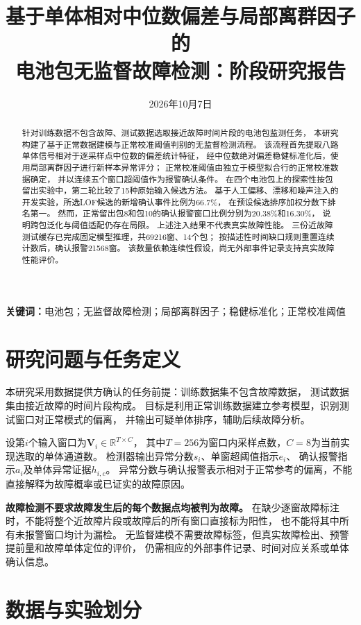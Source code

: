 \documentclass[UTF8,a4paper,12pt,fontset=fandol]{ctexart}
\title{基于单体相对中位数偏差与局部离群因子的\\电池包无监督故障检测：阶段研究报告}
\author{}
\date{2026年10月7日}
\begin{document}
\maketitle
\thispagestyle{plain}

\begin{abstract}
针对训练数据不包含故障、测试数据选取接近故障时间片段的电池包监测任务，
本研究构建了基于正常数据建模与正常校准阈值判别的无监督检测流程。
该流程首先提取八路单体信号相对于逐采样点中位数的偏差统计特征，
经中位数绝对偏差稳健标准化后，使用局部离群因子进行新样本异常评分；
正常校准阈值由独立于模型拟合行的正常校准数据确定，
并以连续五个窗口超阈值作为报警确认条件。
在四个电池包上的探索性按包留出实验中，第二轮比较了15种原始输入候选方法。
基于人工偏移、漂移和噪声注入的开发实验，所选LOF候选的新增确认事件比例为66.7\%，
在预设候选排序加权分数下排名第一。
然而，正常留出包8和包10的确认报警窗口比例分别为20.38\%和16.30\%，
说明跨包泛化与阈值适配仍存在局限。
上述注入结果不代表真实故障性能。
三份近故障测试缓存已完成固定模型推理，共69216窗、14个包；
按描述性时间缺口规则重置连续计数后，确认报警21568窗。
该数量依赖连续性假设，尚无外部事件记录支持真实故障性能评价。
\end{abstract}

\noindent\textbf{关键词：}电池包；无监督故障检测；局部离群因子；稳健标准化；正常校准阈值

\section{研究问题与任务定义}

本研究采用数据提供方确认的任务前提：训练数据集不包含故障数据，
测试数据集由接近故障的时间片段构成。
目标是利用正常训练数据建立参考模型，识别测试窗口对正常模式的偏离，
并输出可疑单体排序，辅助后续故障分析。

设第$i$个输入窗口为$\mathbf{V}_i\in\mathbb{R}^{T\times C}$，
其中$T=256$为窗口内采样点数，$C=8$为当前实现选取的单体通道数。
检测器输出异常分数$s_i$、单窗超阈值指示$e_i$、
确认报警指示$a_i$及单体异常证据$h_{i,c}$。
异常分数与确认报警表示相对于正常参考的偏离，不能直接解释为故障概率或已证实的故障原因。

\textbf{故障检测不要求故障发生后的每个数据点均被判为故障。}
在缺少逐窗故障标注时，不能将整个近故障片段或故障后的所有窗口直接标为阳性，
也不能将其中所有未报警窗口均计为漏检。
无监督建模不需要故障标签，但真实故障检出、预警提前量和故障单体定位的评价，
仍需相应的外部事件记录、时间对应关系或单体确认信息。

\section{数据与实验划分}
\end{document}
